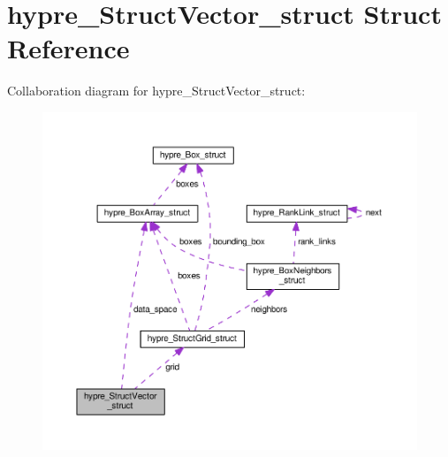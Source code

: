 \hypertarget{structhypre__StructVector__struct}{}\section{hypre\+\_\+\+Struct\+Vector\+\_\+struct Struct Reference}
\label{structhypre__StructVector__struct}


Collaboration diagram for hypre\+\_\+\+Struct\+Vector\+\_\+struct\+:
\nopagebreak
\begin{figure}[H]
\begin{center}
\leavevmode
\includegraphics[width=350pt]{structhypre__StructVector__struct__coll__graph}
\end{center}
\end{figure}
